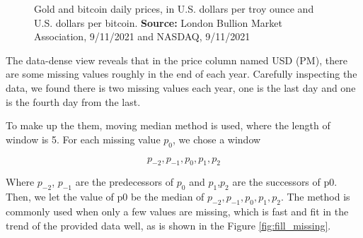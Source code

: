 \documentclass[12pt,a4paper]{article}
\begin{document}
\begin{spacing}{1.2}
\begin{figure}[H]
	\caption{Gold and bitcoin daily prices, in U.S. dollars per troy ounce and U.S. dollars per bitcoin. \textbf{Source:} London Bullion Market 
		Association, 9/11/2021 and NASDAQ, 9/11/2021 }
	\label{figure:missing_data_dense}
\end{figure}


The data-dense view reveals that in the price column named USD (PM), there are some missing values roughly in the end of each year. Carefully inspecting the data, we found there is two missing values each year, one is the last day and one is the fourth day from the last.

To make up the them, moving median method is used, where the length of window is 5.
For each missing value $p_0$, we chose a window

$$
p_{-2},p_{-1},p_{0},p_{1},p_{2}
$$

Where $p_{-2}$, $p_{-1}$ are the predecessors of $p_{0}$ and $p_{1}$,$p_{2}$ are the successors of p0. Then, we let the
value of p0 be the median of ${p_{-2},p_{-1},p_{0},p_{1},p_{2}}$.
The method is commonly used when only a few values are missing, which is fast and fit in the trend of the provided data well, as is shown in the Figure \ref{fig:fill_missing}.


\end{spacing}
\end{document}
